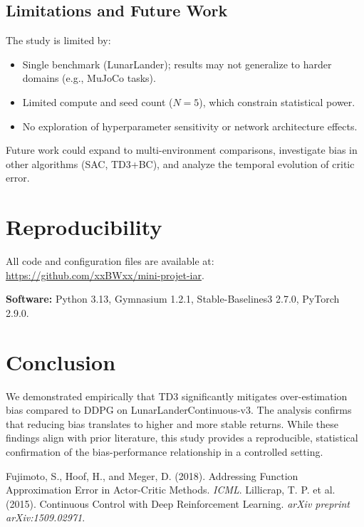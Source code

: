 \documentclass[10pt,letterpaper]{article}
\begin{document}
\subsection{Limitations and Future Work}
The study is limited by:
\begin{itemize}
  \item Single benchmark (LunarLander); results may not generalize to harder domains (e.g., MuJoCo tasks).
  \item Limited compute and seed count ($N=5$), which constrain statistical power.
  \item No exploration of hyperparameter sensitivity or network architecture effects.
\end{itemize}
Future work could expand to multi-environment comparisons, investigate bias in other algorithms (SAC, TD3+BC), and analyze the temporal evolution of critic error.

\section{Reproducibility}
All code and configuration files are available at:
\url{https://github.com/xxBWxx/mini-projet-iar}.

\noindent
\textbf{Software:} Python 3.13, Gymnasium 1.2.1, Stable-Baselines3 2.7.0, PyTorch 2.9.0. 

\section{Conclusion}
We demonstrated empirically that TD3 significantly mitigates over-estimation bias compared to DDPG on LunarLanderContinuous-v3. The analysis confirms that reducing bias translates to higher and more stable returns. While these findings align with prior literature, this study provides a reproducible, statistical confirmation of the bias-performance relationship in a controlled setting.


\begin{thebibliography}{9}
 Fujimoto, S., Hoof, H., and Meger, D. (2018). Addressing Function Approximation Error in Actor-Critic Methods. \textit{ICML}.
 Lillicrap, T. P. et al. (2015). Continuous Control with Deep Reinforcement Learning. \textit{arXiv preprint arXiv:1509.02971}.
\end{thebibliography}
\end{document}
